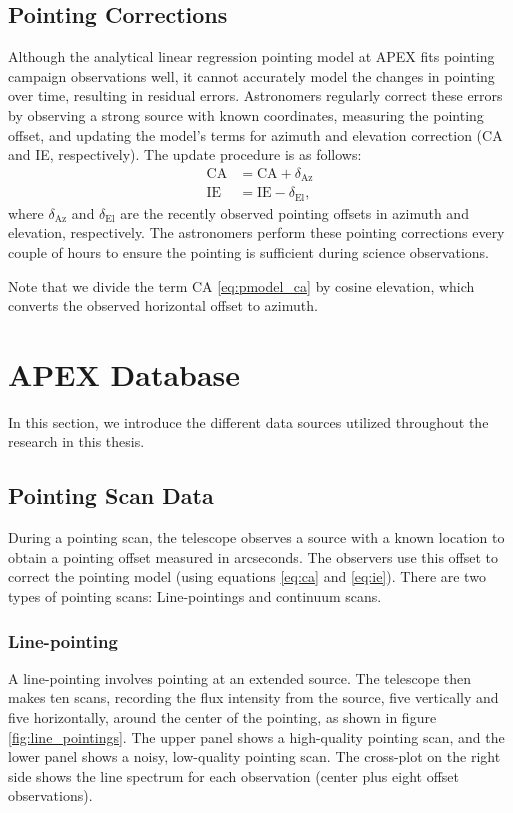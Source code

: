 \subsection{Pointing Corrections} 
Although the analytical linear regression pointing model at APEX fits pointing campaign observations well,
it cannot accurately model the changes in pointing over time, resulting in residual errors.
Astronomers regularly correct these errors by observing a strong source with known coordinates,
measuring the pointing offset, and updating the model's terms for azimuth and elevation correction (CA and IE, respectively).
The update procedure is as follows:
\begin{align}
    \text{CA} &= \text{CA} + \delta_{\text{Az}} \label{eq:ca}\\ 
    \text{IE} &= \text{IE} - \delta_{\text{El}},\label{eq:ie}
\end{align}
where $\delta_{\text{Az}}$ and $\delta_{\text{El}}$ are the recently observed pointing offsets in azimuth and elevation, respectively.
The astronomers perform these pointing corrections every couple of hours to ensure the pointing is sufficient during science observations.

Note that we divide the term CA \eqref{eq:pmodel_ca} by cosine elevation, which converts the observed horizontal offset to azimuth.

\section{APEX Database} \label{sec:database}
In this section, we introduce the different data sources utilized throughout the research in this thesis.


\subsection{Pointing Scan Data}
During a pointing scan, the telescope observes a source with a known location to obtain a pointing offset measured in arcseconds.
The observers use this offset to correct the pointing model (using equations \eqref{eq:ca} and \eqref{eq:ie}).
There are two types of pointing scans: Line-pointings and continuum scans.

\subsubsection{Line-pointing}
A line-pointing involves pointing at an extended source. 
The telescope then makes ten scans, recording the flux intensity from the source, five vertically and five horizontally,
around the center of the pointing, as shown in figure \ref{fig:line_pointings}.
The upper panel shows a high-quality pointing scan, and the lower panel shows a noisy, low-quality pointing scan.
The cross-plot on the right side shows the line spectrum for each observation (center plus eight offset observations).

